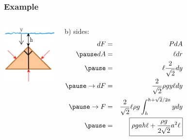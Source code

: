 \documentclass[]{beamer}
\begin{document}

  \begin{frame}
    \frametitle{Example \theexample}
    
   
    
    \begin{columns}[c]
    
      \begin{center}
        \includegraphics[height=1.2in]{images2/example_12.97c.jpg}
      \end{center}
      
    
      \column{2.5in}
      
      b) sides:
      \textcolor{mypink1}{
      \begin{eqnarray*}
      dF&=&PdA\\
       \pause
      dA &=&\ell dr\\
      \pause
      &=&\ell\frac{2}{\sqrt{2}}dy\\
      \pause
      \rightarrow dF&=&\frac{2}{\sqrt{2}}\rho g y\ell dy\\
      \pause
      \rightarrow F&=&\frac{2}{\sqrt{2}} \ell \rho g \int^{h+\sqrt{2}/2 a}_{h} y dy\\
      \pause
      &=&\boxed{\rho g a h \ell + \frac{\rho g}{2\sqrt{2}}a^2\ell}\\
      \end{eqnarray*}
      }
      \end{columns}
    
      
    
      \end{frame}


\end{document}
